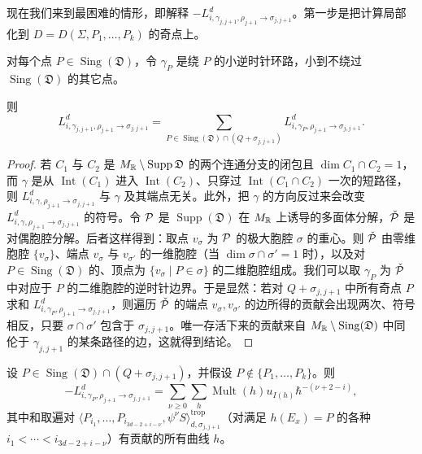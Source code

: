 现在我们来到最困难的情形，即解释 $-L^d_{i,\gamma_{j,j+1},\rho_{j+1}\to\sigma_{j,j+1}}$。第一步是把计算局部化到 $D=D(\Sigma,P_1,\ldots,P_k)$ 的奇点上。

\begin{lemma}
对每个点 $P\in\operatorname{Sing}(\mathfrak D)$，令 $\gamma_P$ 是绕 $P$ 的小逆时针环路，小到不绕过 $\operatorname{Sing}(\mathfrak D)$ 的其它点。

则
\[
  L^d_{i,\gamma_{j,j+1},\rho_{j+1}\to\sigma_{j,j+1}}
  =\sum_{P\in\operatorname{Sing}(\mathfrak D)\cap(Q+\sigma_{j,j+1})}L^d_{i,\gamma_P,\rho_{j+1}\to\sigma_{j,j+1}}.
\]
\end{lemma}

\begin{proof}
若 $C_1$ 与 $C_2$ 是 $M_{\mathbb{R}}\setminus\operatorname{Supp}\mathfrak D$ 的两个连通分支的闭包且 $\dim C_1\cap C_2=1$，而 $\gamma$ 是从 $\operatorname{Int}(C_1)$ 进入 $\operatorname{Int}(C_2)$、只穿过 $\operatorname{Int}(C_1\cap C_2)$ 一次的短路径，则 $L^d_{i,\gamma,\rho_{j+1}\to\sigma_{j,j+1}}$ 与 $\gamma$ 及其端点无关。此外，把 $\gamma$ 的方向反过来会改变 $L^d_{i,\gamma,\rho_{j+1}\to\sigma_{j,j+1}}$ 的符号。令 $\mathcal{P}$ 是 $\operatorname{Supp}(\mathfrak D)$ 在 $M_{\mathbb{R}}$ 上诱导的多面体分解，$\check{\mathcal{P}}$ 是对偶胞腔分解。后者这样得到：取点 $v_\sigma$ 为 $\mathcal{P}$ 的极大胞腔 $\sigma$ 的重心。则 $\check{\mathcal{P}}$ 由零维胞腔 $\{v_\sigma\}$、端点 $v_\sigma$ 与 $v_{\sigma'}$ 的一维胞腔（当 $\dim\sigma\cap\sigma'=1$ 时），以及对 $P\in\operatorname{Sing}(\mathfrak D)$ 的、顶点为 $\{v_\sigma\mid P\in\sigma\}$ 的二维胞腔组成。我们可以取 $\gamma_P$ 为 $\check{\mathcal{P}}$ 中对应于 $P$ 的二维胞腔的逆时针边界。于是显然：若对 $Q+\sigma_{j,j+1}$ 中所有奇点 $P$ 求和 $L^d_{i,\gamma_P,\rho_{j+1}\to\sigma_{j,j+1}}$，则遍历 $\check{\mathcal{P}}$ 的端点 $v_\sigma,v_{\sigma'}$ 的边所得的贡献会出现两次、符号相反，只要 $\sigma\cap\sigma'$ 包含于 $\sigma_{j,j+1}$。唯一存活下来的贡献来自 $M_{\mathbb{R}}\setminus\operatorname{Sing}(\mathfrak D)$ 中同伦于 $\gamma_{j,j+1}$ 的某条路径的边，这就得到结论。
\end{proof}

\begin{lemma}
设 $P\in\operatorname{Sing}(\mathfrak D)\cap(Q+\sigma_{j,j+1})$，并假设 $P\notin\{P_1,\ldots,P_k\}$。则
\[
  -L^d_{i,\gamma_P,\rho_{j+1}\to\sigma_{j,j+1}}
  =\sum_{\nu\ge0}\sum_{h}\operatorname{Mult}(h)u_{I(h)}\hbar^{-(\nu+2-i)},
\]
其中和取遍对 $\langle P_{i_1},\ldots,P_{i_{3d-2+i-\nu}},\psi^\nu S\rangle^{\mathrm{trop}}_{d,\sigma_{j,j+1}}$（对满足 $h(E_x)=P$ 的各种 $i_1<\cdots<i_{3d-2+i-\nu}$）有贡献的所有曲线 $h$。
\end{lemma}

